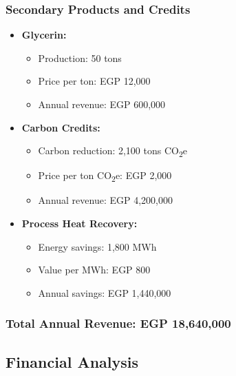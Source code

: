 \subsubsection{Secondary Products and Credits}
\begin{itemize}
    \item \textbf{Glycerin:}
    \begin{itemize}
        \item Production: 50 tons
        \item Price per ton: EGP 12,000
        \item Annual revenue: EGP 600,000
    \end{itemize}
    
    \item \textbf{Carbon Credits:}
    \begin{itemize}
        \item Carbon reduction: 2,100 tons CO\textsubscript{2}e
        \item Price per ton CO\textsubscript{2}e: EGP 2,000
        \item Annual revenue: EGP 4,200,000
    \end{itemize}
    
    \item \textbf{Process Heat Recovery:}
    \begin{itemize}
        \item Energy savings: 1,800 MWh
        \item Value per MWh: EGP 800
        \item Annual savings: EGP 1,440,000
    \end{itemize}
\end{itemize}

\subsubsection{Total Annual Revenue: EGP 18,640,000}

\subsection{Financial Analysis}


